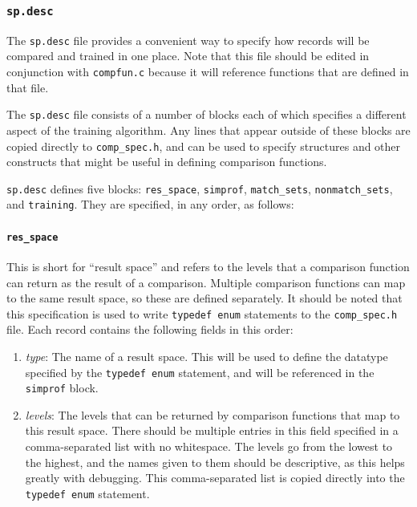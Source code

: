 \documentclass[10pt, letterpaper]{article}
\begin{document}
\subsubsection{\texttt{sp.desc}}
The \texttt{sp.desc} file provides a convenient way to specify how records will be compared and trained in one place.
Note that this file should be edited in conjunction with \texttt{compfun.c} because it will reference functions that are defined in that file.

The \texttt{sp.desc} file consists of a number of blocks each of which specifies a different aspect of the training algorithm.
Any lines that appear outside of these blocks are copied directly to \texttt{comp\_spec.h}, and can be used to specify structures and other constructs that might be useful in defining comparison functions.

\texttt{sp.desc} defines five blocks: \texttt{res\_space}, \texttt{simprof}, \texttt{match\_sets}, \texttt{nonmatch\_sets}, and \texttt{training}.
They are specified, in any order, as follows:

\paragraph{\texttt{res\_space}}
This is short for ``result space'' and refers to the levels that a comparison function can return as the result of a comparison.
Multiple comparison functions can map to the same result space, so these are defined separately.
It should be noted that this specification is used to write \texttt{typedef enum} statements to the \texttt{comp\_spec.h} file.
Each record contains the following fields in this order:
\begin{enumerate}
\item \emph{type}: The name of a result space. This will be used to define the datatype specified by the \texttt{typedef enum} statement, and will be referenced
in the \texttt{simprof} block.
\item \emph{levels}: The levels that can be returned by comparison functions that map to this result space. There should be multiple entries in this field
specified in a comma-separated list with no whitespace. The levels go from the lowest to the highest, and the names given to them should be descriptive, as this helps
greatly with debugging. This comma-separated list is copied directly into the \texttt{typedef enum} statement.
\end{enumerate}
\end{document}
